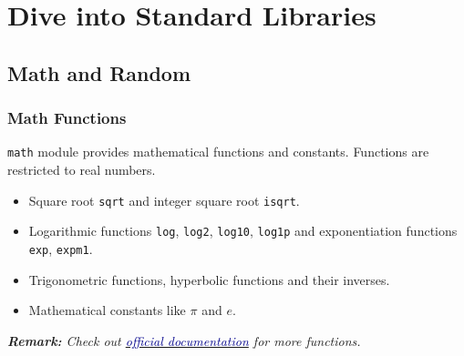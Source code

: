 \documentclass[beamer, en, version=2.0]{huangfusl-template}
\begin{document}


    \section{Dive into Standard Libraries}
    \subsection{Math and Random}
    \begin{frame}[fragile]
        \frametitle{Math Functions}

        {\footnotesize\verb|math|} module provides mathematical functions and constants. Functions are restricted to real numbers.

        \begin{itemize}
            \item Square root {\footnotesize\verb|sqrt|} and integer square root {\footnotesize\verb|isqrt|}.
            \item Logarithmic functions {\footnotesize\verb|log|}, {\footnotesize\verb|log2|}, {\footnotesize\verb|log10|}, {\footnotesize\verb|log1p|} and exponentiation functions {\footnotesize\verb|exp|}, {\footnotesize\verb|expm1|}.
            \item Trigonometric functions, hyperbolic functions and their inverses.
            \item Mathematical constants like $\pi$ and $e$.
        \end{itemize}

        {\footnotesize\itshape\textbf{Remark:} Check out \href{https://docs.python.org/3/library/math.html}{\textcolor{darkblue}{official documentation}} for more functions.}
    \end{frame}
\end{document}
